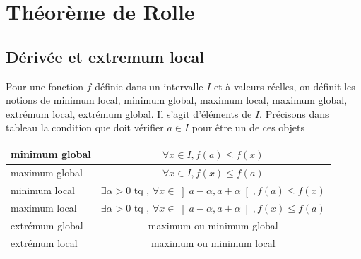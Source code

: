 \section{Théorème de Rolle}
\subsection{Dérivée et extremum local}
\begin{defi}
Pour une fonction $f$ définie dans un intervalle $I$ et à valeurs réelles, on définit les notions de minimum local, minimum global, maximum local, maximum global, extrémum local, extrémum global.\newline
Il s'agit d'éléments de $I$. Précisons dans tableau la condition que doit vérifier $a\in I$ pour être un de ces objets
\begin{center}
\renewcommand{\arraystretch}{1.5}
\begin{tabular}{|l|c|}\hline
minimum global & $\forall x \in I, f(a) \leq f(x)$   \\ \hline
maximum global & $\forall x \in I, f(x) \leq f(a)$ \\ \hline 
minimum local  & $\exists \alpha >0 \text{ tq },\, \forall x \in \left] a-\alpha, a+\alpha\right[ , f(a) \leq f(x)$ \\ \hline 
maximum local  & $\exists \alpha >0 \text{ tq },\, \forall x \in \left] a-\alpha, a+\alpha\right[ , f(x) \leq f(a)$ \\ \hline
extrémum global & maximum ou minimum global \\ \hline
extrémum local & maximum ou minimum local \\ \hline
\end{tabular}
\end{center}

\end{defi}

